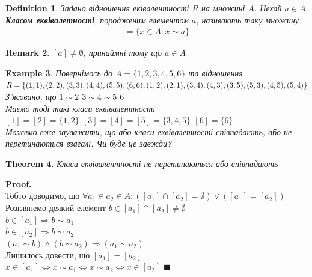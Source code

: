 \documentclass[a4paper, 14pt]{extarticle}
\theoremstyle{theoremdd}
\newtheorem{theorem}{Theorem}[subsection]
\theoremstyle{theoremdd}
\newtheorem{definition}[theorem]{Definition}
\theoremstyle{theoremdd}
\theoremstyle{theoremdd}
\newtheorem{example}[theorem]{Example}
\theoremstyle{theoremdd}
\theoremstyle{theoremdd}
\newtheorem{remark}[theorem]{Remark}
\theoremstyle{theoremdd}
\theoremstyle{theoremdd}
\newenvironment{pf}{\vspace*{-3mm} \textbf{Proof. \\}}{$\blacksquare$}
\begin{document}
\begin{definition}
Задано відношення еківалентності $R$ на множині $A$. Нехай $a \in A$\\
\textbf{Класом еквівалетності}, породженим елементом $a$, називають таку множину
\begin{align*}
[a] = \{x \in A: x \sim a\}
\end{align*}
\end{definition}

\begin{remark}
$[a] \neq \emptyset$, принаймні тому що $a \in A$
\end{remark}

\begin{example}
Повернімось до $A = \{1,2,3,4,5,6\}$ та відношення\\
$R = \{(1,1),(2,2),(3,3),(4,4),(5,5),(6,6),(1,2),(2,1),(3,4),(4,3),(3,5), \\ (5,3),(4,5),(5,4)\}$\\
З'ясовано, що $1 \sim 2$ \hspace{0.5cm} $3 \sim 4 \sim 5$ \hspace{0.5cm} $6$\\
Маємо тоді такі класи еквівалентності\\
$[1] = [2] = \{1,2\}$ \hspace{0.5cm} $[3] = [4] = [5] = \{3,4,5\}$ \hspace{0.5cm} $[6] = \{6\}$\\
Можемо вже зауважити, що або класи еквівалетності співпадають, або не перетинаються взагалі. Чи буде це завжди?
\end{example}

\begin{theorem}
Класи еквівалентності не перетинаються або співпадають
\end{theorem}

\begin{pf}
Тобто доводимо, що $\forall a_1 \in a_2 \in A: ([a_1] \cap [a_2] = \emptyset) \vee ([a_1] = [a_2])$\\
Розглянемо деякий елемент $b \in [a_1] \cap [a_2] \neq \emptyset$\\
$b \in [a_1] \Rightarrow b \sim a_1$\\
$b \in [a_2] \Rightarrow b \sim a_2$\\
$(a_1 \sim b) \wedge (b \sim a_2) \Rightarrow (a_1 \sim a_2)$\\
Лишилось довести, що $[a_1] = [a_2]$\\
$x \in [a_1] \iff x \sim a_1 \iff x \sim a_2 \iff x \in [a_2]$
\end{pf}
\end{document}
